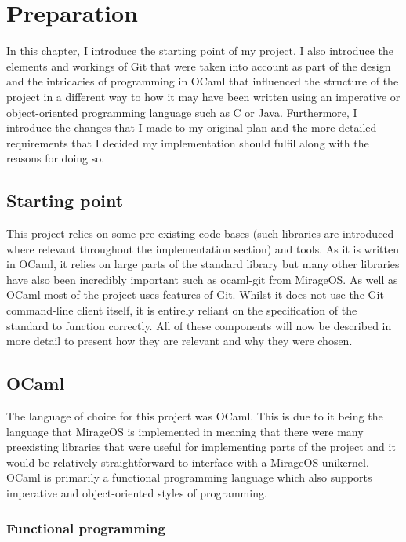 \chapter{Preparation}

In this chapter, I introduce the starting point of my project. I also introduce the elements and workings of Git that were taken into account as part of the design and the intricacies of programming in OCaml that influenced the structure of the project in a different way to how it may have been written using an imperative or object-oriented programming language such as C or Java. Furthermore, I introduce the changes that I made to my original plan and the more detailed requirements that I decided my implementation should fulfil along with the reasons for doing so.

\section{Starting point}

This project relies on some pre-existing code bases (such libraries are introduced where relevant throughout the implementation section) and tools. As it is written in OCaml, it relies on large parts of the standard library but many other libraries have also been incredibly important such as ocaml-git from MirageOS. As well as OCaml most of the project uses features of Git. Whilst it does not use the Git command-line client itself, it is entirely reliant on the specification of the standard to function correctly. All of these components will now be described in more detail to present how they are relevant and why they were chosen.

\section{OCaml}

The language of choice for this project was OCaml\cite{code_ocaml}. This is due to it being the language that MirageOS is implemented in meaning that there were many preexisting libraries that were useful for implementing parts of the project and it would be relatively straightforward to interface with a MirageOS unikernel. OCaml is primarily a functional programming language which also supports imperative and object-oriented styles of programming.

\subsection{Functional programming}

